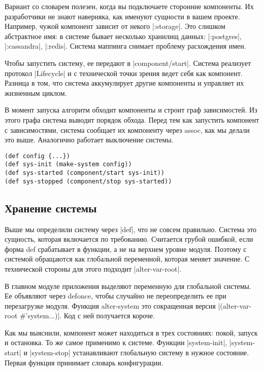 Вариант со словарем полезен, когда вы подключаете сторонние компоненты. Их
разработчики не знают наверняка, как именуют сущности в вашем проекте. Например,
чужой компонент зависит от некого \spverb|:storage|. Это слишком абстрактное имя: в
системе бывает несколько хранилищ данных: \spverb|:postgres|, \spverb|:cassandra|,
\spverb|:redis|. Система маппинга снимает проблему расхождения имен.

Чтобы запустить систему, ее передают в \spverb|component/start|. Система реализует
протокол \spverb|Lifecycle| и с технической точки зрения ведет себя как
компонент. Разница в том, что система аккумулирует другие компоненты и управляет
их жизненным циклом.

В момент запуска алгоритм обходит компоненты и строит граф зависимостей. Из
этого графа система выводит порядок обхода. Перед тем как запустить компонент с
зависимостями, система сообщает их компоненту через assoc, как мы делали это
выше. Аналогично работает выключение системы.

\begin{verbatim}
(def config {...})
(def sys-init (make-system config))
(def sys-started (component/start sys-init))
(def sys-stopped (component/stop sys-started))
\end{verbatim}

\subsection{Хранение системы}

Выше мы определили систему через \spverb|def|, что не совсем правильно. Система это
сущность, которая включается по требованию. Считается грубой ошибкой, если форма
def срабатывает в функции, а не на верхнем уровне модуля. Поэтому с системой
обращаются как глобальной переменной, которая меняет значение. С технической
стороны для этого подходит \spverb|alter-var-root|.

В главном модуле приложения выделяют переменную для глобальной системы. Ее
объявляют через defonce, чтобы случайно не переопределить ее при перезагрузке
модуля. Функция alter-system это сокращенная версия \spverb|(alter-var-root #'system...)|.
Код с ней получается короче.

Как мы выяснили, компонент может находиться в трех состояниях: покой, запуск и
остановка. То же самое применимо к системе. Функции \spverb|system-init|,
\spverb|system-start| и \spverb|system-stop| устанавливают глобальную систему в нужное
состояние. Первая функция принимает словарь конфигурации.

